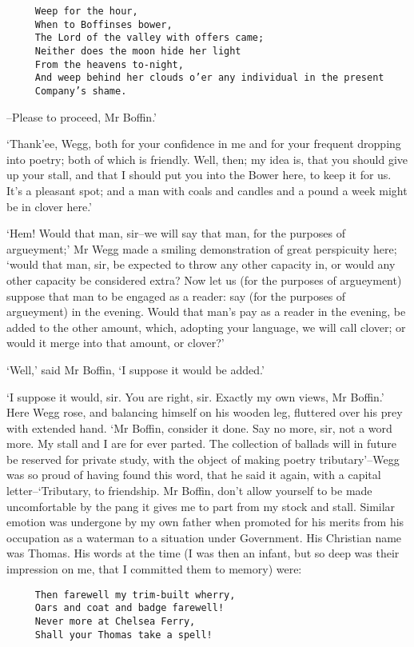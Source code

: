 \begin{verbatim}
     Weep for the hour,
     When to Boffinses bower,
     The Lord of the valley with offers came;
     Neither does the moon hide her light
     From the heavens to-night,
     And weep behind her clouds o’er any individual in the present
     Company’s shame.
\end{verbatim}

--Please to proceed, Mr Boffin.’

‘Thank’ee, Wegg, both for your confidence in me and for your frequent
dropping into poetry; both of which is friendly. Well, then; my idea is,
that you should give up your stall, and that I should put you into the
Bower here, to keep it for us. It’s a pleasant spot; and a man with
coals and candles and a pound a week might be in clover here.’

‘Hem! Would that man, sir--we will say that man, for the purposes of
argueyment;’ Mr Wegg made a smiling demonstration of great perspicuity
here; ‘would that man, sir, be expected to throw any other capacity in,
or would any other capacity be considered extra? Now let us (for the
purposes of argueyment) suppose that man to be engaged as a reader: say
(for the purposes of argueyment) in the evening. Would that man’s pay as
a reader in the evening, be added to the other amount, which, adopting
your language, we will call clover; or would it merge into that amount,
or clover?’

‘Well,’ said Mr Boffin, ‘I suppose it would be added.’

‘I suppose it would, sir. You are right, sir. Exactly my own views,
Mr Boffin.’ Here Wegg rose, and balancing himself on his wooden leg,
fluttered over his prey with extended hand. ‘Mr Boffin, consider it
done. Say no more, sir, not a word more. My stall and I are for ever
parted. The collection of ballads will in future be reserved for private
study, with the object of making poetry tributary’--Wegg was so proud
of having found this word, that he said it again, with a capital
letter--‘Tributary, to friendship. Mr Boffin, don’t allow yourself to
be made uncomfortable by the pang it gives me to part from my stock and
stall. Similar emotion was undergone by my own father when promoted
for his merits from his occupation as a waterman to a situation under
Government. His Christian name was Thomas. His words at the time (I was
then an infant, but so deep was their impression on me, that I committed
them to memory) were:

\begin{verbatim}
     Then farewell my trim-built wherry,
     Oars and coat and badge farewell!
     Never more at Chelsea Ferry,
     Shall your Thomas take a spell!
\end{verbatim}

